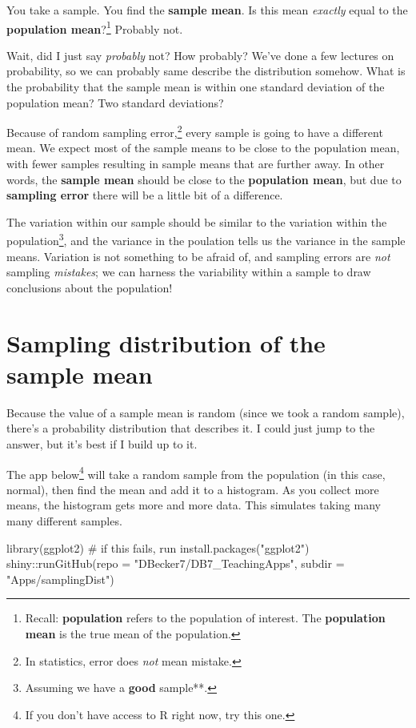 \documentclass[
  letterpaper,
  DIV=11,
  numbers=noendperiod]{scrreprt}
\newenvironment{Shaded}{\begin{snugshade}}{\end{snugshade}}
\newcommand{\AttributeTok}[1]{\textcolor[rgb]{0.40,0.45,0.13}{#1}}
\newcommand{\CommentTok}[1]{\textcolor[rgb]{0.37,0.37,0.37}{#1}}
\newcommand{\FunctionTok}[1]{\textcolor[rgb]{0.28,0.35,0.67}{#1}}
\newcommand{\NormalTok}[1]{\textcolor[rgb]{0.00,0.23,0.31}{#1}}
\newcommand{\SpecialCharTok}[1]{\textcolor[rgb]{0.37,0.37,0.37}{#1}}
\newcommand{\StringTok}[1]{\textcolor[rgb]{0.13,0.47,0.30}{#1}}
\begin{document}
You take a sample. You find the \textbf{sample mean}. Is this mean
\emph{exactly} equal to the \textbf{population mean}?\footnote{Recall:
  \textbf{population} refers to the population of interest. The
  \textbf{population mean} is the true mean of the population.} Probably
not.

Wait, did I just say \emph{probably} not? How probably? We've done a few
lectures on probability, so we can probably same describe the
distribution somehow. What is the probability that the sample mean is
within one standard deviation of the population mean? Two standard
deviations?

Because of random sampling error,\footnote{In statistics, error does
  \emph{not} mean mistake.} every sample is going to have a different
mean. We expect most of the sample means to be close to the population
mean, with fewer samples resulting in sample means that are further
away. In other words, the \textbf{sample mean} should be close to the
\textbf{population mean}, but due to \textbf{sampling error} there will
be a little bit of a difference.

The variation within our sample should be similar to the variation
within the population\footnote{Assuming we have a \textbf{good}
  sample**.}, and the variance in the poulation tells us the variance in
the sample means. Variation is not something to be afraid of, and
sampling errors are \emph{not} sampling \emph{mistakes}; we can harness
the variability within a sample to draw conclusions about the
population!

\hypertarget{sampling-distribution-of-the-sample-mean}{%
\chapter{Sampling distribution of the sample
mean}\label{sampling-distribution-of-the-sample-mean}}

Because the value of a sample mean is random (since we took a random
sample), there's a probability distribution that describes it. I could
just jump to the answer, but it's best if I build up to it.

The app below\footnote{If you don't have access to R right now, try this
  one.} will take a random sample from the population (in this case,
normal), then find the mean and add it to a histogram. As you collect
more means, the histogram gets more and more data. This simulates taking
many many different samples.

\begin{Shaded}
\begin{Highlighting}[]
\FunctionTok{library}\NormalTok{(ggplot2) }\CommentTok{\# if this fails, run install.packages("ggplot2")}
\NormalTok{shiny}\SpecialCharTok{::}\FunctionTok{runGitHub}\NormalTok{(}\AttributeTok{repo =} \StringTok{"DBecker7/DB7\_TeachingApps"}\NormalTok{, }
    \AttributeTok{subdir =} \StringTok{"Apps/samplingDist"}\NormalTok{)}
\end{Highlighting}
\end{Shaded}
\end{document}
